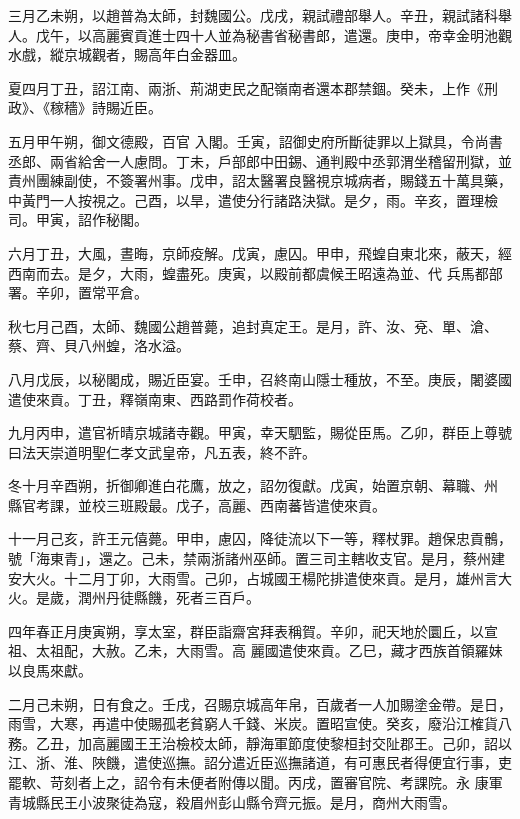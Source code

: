 \begin{pinyinscope}
 三月乙未朔，以趙普為太師，封魏國公。戊戌，親試禮部舉人。辛丑，親試諸科舉人。戊午，以高麗賓貢進士四十人並為秘書省秘書郎，遣還。庚申，帝幸金明池觀水戲，縱京城觀者，賜高年白金器皿。



 夏四月丁丑，詔江南、兩浙、荊湖吏民之配嶺南者還本郡禁錮。癸未，上作《刑政》、《稼穡》詩賜近臣。



 五月甲午朔，御文德殿，百官
 入閣。壬寅，詔御史府所斷徒罪以上獄具，令尚書丞郎、兩省給舍一人慮問。丁未，戶部郎中田錫、通判殿中丞郭渭坐稽留刑獄，並責州團練副使，不簽署州事。戊申，詔太醫署良醫視京城病者，賜錢五十萬具藥，中黃門一人按視之。己酉，以旱，遣使分行諸路決獄。是夕，雨。辛亥，置理檢司。甲寅，詔作秘閣。



 六月丁丑，大風，晝晦，京師疫解。戊寅，慮囚。甲申，飛蝗自東北來，蔽天，經西南而去。是夕，大雨，蝗盡死。庚寅，以殿前都虞候王昭遠為並、代
 兵馬都部署。辛卯，置常平倉。



 秋七月己酉，太師、魏國公趙普薨，追封真定王。是月，許、汝、兗、單、滄、蔡、齊、貝八州蝗，洛水溢。



 八月戊辰，以秘閣成，賜近臣宴。壬申，召終南山隱士種放，不至。庚辰，闍婆國遣使來貢。丁丑，釋嶺南東、西路罰作荷校者。



 九月丙申，遣官祈晴京城諸寺觀。甲寅，幸天駟監，賜從臣馬。乙卯，群臣上尊號曰法天崇道明聖仁孝文武皇帝，凡五表，終不許。



 冬十月辛酉朔，折御卿進白花鷹，放之，詔勿復獻。戊寅，始置京朝、幕職、州
 縣官考課，並校三班殿最。戊子，高麗、西南蕃皆遣使來貢。



 十一月己亥，許王元僖薨。甲申，慮囚，降徒流以下一等，釋杖罪。趙保忠貢鶻，號「海東青」，還之。己未，禁兩浙諸州巫師。置三司主轄收支官。是月，蔡州建安大火。十二月丁卯，大雨雪。己卯，占城國王楊陀排遣使來貢。是月，雄州言大火。是歲，潤州丹徒縣饑，死者三百戶。



 四年春正月庚寅朔，享太室，群臣詣齋宮拜表稱賀。辛卯，祀天地於圜丘，以宣祖、太祖配，大赦。乙未，大雨雪。高
 麗國遣使來貢。乙巳，藏才西族首領羅妹以良馬來獻。



 二月己未朔，日有食之。壬戌，召賜京城高年帛，百歲者一人加賜塗金帶。是日，雨雪，大寒，再遣中使賜孤老貧窮人千錢、米炭。置昭宣使。癸亥，廢沿江榷貨八務。乙丑，加高麗國王王治檢校太師，靜海軍節度使黎桓封交阯郡王。己卯，詔以江、浙、淮、陜饑，遣使巡撫。詔分遣近臣巡撫諸道，有可惠民者得便宜行事，吏罷軟、苛刻者上之，詔令有未便者附傳以聞。丙戌，置審官院、考課院。永
 康軍青城縣民王小波聚徒為寇，殺眉州彭山縣令齊元振。是月，商州大雨雪。




\end{pinyinscope}
